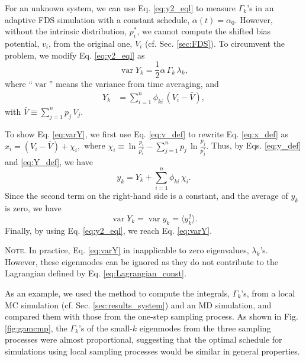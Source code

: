 \documentclass[reprint, floatfix]{revtex4-1}
\newcommand{\note}[1]{{\color{DarkGreen}\footnotesize \textsc{Note.} #1}}
\begin{document}
%
For an unknown system,
we can use Eq. \eqref{eq:y2_eql} to
measure $\Gamma_k$'s in
an adaptive FDS simulation
with a constant schedule,
$\alpha(t) = \alpha_0$.
%
However,
without the intrinsic distribution, $p^*_i$,
we cannot compute the shifted bias potential, $v_i$,
from the original one, $V_i$
(cf. Sec. \ref{sec:FDS}).
%
To circumvent the problem, we
modify Eq. \eqref{eq:y2_eql} as
%
\begin{equation}
  \operatorname{var} Y_k
  =
  \frac{1}{2}
  \alpha \, \Gamma_k \, \lambda_k,
\label{eq:varY}
\end{equation}
%
where
``$\operatorname{var}$''
means the variance from time averaging,
and
%
\begin{align}
Y_k
&=
\sum_{ i = 1 }^n
  \phi_{k i} \, (V_i - \bar V),
\label{eq:Y_def}
\end{align}
%
with
$
\bar V
\equiv
\sum_{ j = 1 }^n p_j \, V_j.
$

To show Eq. \eqref{eq:varY},
we first use Eq. \eqref{eq:v_def}
to rewrite Eq. \eqref{eq:x_def}
as
$
  x_i
  =
  (V_i - \bar V) + \chi_i,
$
where
$
  \chi_i
  \equiv
  \ln \frac{ p_i } { p^*_i }
  -
  \sum_{ j = 1 }^n
    p_j \, \ln \frac{ p_j } { p^*_j }.
$
Thus, by Eqs. \eqref{eq:y_def} and \eqref{eq:Y_def},
we have
$$
y_k = Y_k + \sum_{i = 1}^n \phi_{k i} \, \chi_i.
$$
Since the second term on the right-hand side
is a constant, and the average of $y_k$ is zero,
we have
$$
\operatorname{var} Y_k
=
\operatorname{var} y_k
=
\langle y_k^2 \rangle.
$$
Finally, by using Eq. \eqref{eq:y2_eql},
we reach Eq. \eqref{eq:varY}.

\note{In practice, Eq. \eqref{eq:varY}
in inapplicable to zero eigenvalues, $\lambda_k$'s.
%
However, these eigenmodes can be ignored
as they do not contribute to the Lagrangian defined by
Eq. \eqref{eq:Lagrangian_const}.
}


As an example, we used the method to compute
the integrals, $\Gamma_k$'s, from
a local MC simulation
(cf. Sec. \ref{sec:results_system})
and an MD simulation,
and compared them with those from
the one-step sampling process.
%
As shown in Fig. \ref{fig:gamcmp},
the $\Gamma_k$'s of the small-$k$ eigenmodes
from the three sampling processes
were almost proportional,
suggesting that
the optimal schedule
for simulations using local sampling processes
would be similar in general properties.
\end{document}
